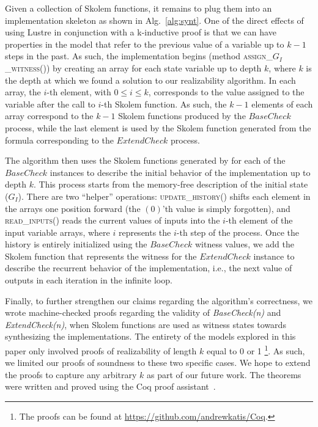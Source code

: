 Given a collection of Skolem functions, it remains to plug them into
an implementation skeleton as shown in Alg.~\ref{alg:synt}. One of the
direct effects of using Lustre in conjunction with a k-inductive proof
is that we can have properties in the model that refer to the
previous value of a variable up to $k-1$ steps in the past. As such,
the implementation begins (method \textsc{assign\_$G_{I}$\_witness()})
by creating an array for each state variable up to depth $k$, where
$k$ is the depth at which we found a solution to our realizability
algorithm. In each array, the $i$-th element, with $0\leq i \leq k$,
corresponds to the value assigned to the variable after the call to
$i$-th Skolem function. As such, the $k-1$ elements of each array
correspond to the $k-1$ Skolem functions produced by the
$\mathit{BaseCheck}$ process, while the last element is used by the
Skolem function generated from the formula corresponding to the
$\mathit{ExtendCheck}$ process.

The algorithm then uses the Skolem functions generated by \aeval for each
of the $\mathit{BaseCheck}$ instances to describe the initial behavior of
the implementation up to depth $k$.  This process starts from the memory-free
description of the initial state ($G_I$). 
There are two ``helper'' operations:
\textsc{update\_history()} shifts each element in the arrays one position
forward (the $(0)$'th value is simply forgotten), and \textsc{read\_inputs()} reads the
current values of inputs into the $i$-th element of the input variable arrays,
where $i$ represents the $i$-th step of the process.
Once the history is entirely initialized using the $\mathit{BaseCheck}$ witness values,
we add the Skolem function that represents the witness for the
$\mathit{ExtendCheck}$ instance to describe the recurrent behavior of the implementation, i.e.,
the next value of outputs in each iteration in the infinite loop.

Finally, to further strengthen our claims regarding the algorithm's
correctness, we wrote machine-checked proofs regarding the validity of \textit{BaseCheck(n)} and
\textit{ExtendCheck(n)}, when Skolem functions are used as witness states
towards synthesizing the implementations. The entirety of the models explored in
this paper only involved proofs of realizability of length $k$ equal to 0 or
1%
\footnote{The proofs can be found at \url{https://github.com/andrewkatis/Coq}.}.
As such, we limited our proofs of soundness to these two specific cases. We hope
to extend the proofs to capture any arbitrary $k$ as part of our future work.
The theorems were written and proved using the Coq proof
assistant~\cite{Coqmanual}.

